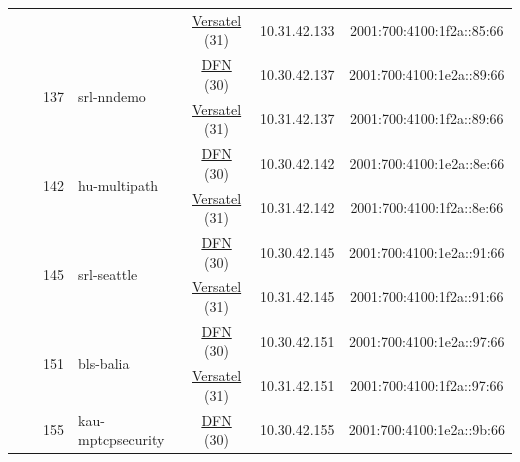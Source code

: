 \begin{small}
\begin{center}
\begin{longtable}{|c|c|c|c|c|c|c|c|}
  &  &  &  & \multicolumn{2}{|c|}{\tiny{\href{http://www.versatel.de}{Versatel} (31)}} & \tiny{10.31.42.133} & \tiny{2001:700:4100:1f2a::85:66} \\* \cline{3-3}\cline{4-4}\cline{5-5}\cline{6-6}\cline{7-7}\cline{8-8}
  &  & \multirow{2}{*}{\tiny{137}} & \multicolumn{1}{|l|}{\multirow{2}{*}{\tiny{srl-nndemo}}} & \multicolumn{2}{|c|}{\tiny{\href{https://www.dfn.de}{DFN} (30)}} & \tiny{10.30.42.137} & \tiny{2001:700:4100:1e2a::89:66} \\* \cline{5-5}\cline{6-6}\cline{7-7}\cline{8-8}
  &  &  &  & \multicolumn{2}{|c|}{\tiny{\href{http://www.versatel.de}{Versatel} (31)}} & \tiny{10.31.42.137} & \tiny{2001:700:4100:1f2a::89:66} \\* \cline{3-3}\cline{4-4}\cline{5-5}\cline{6-6}\cline{7-7}\cline{8-8}
  &  & \multirow{2}{*}{\tiny{142}} & \multicolumn{1}{|l|}{\multirow{2}{*}{\tiny{hu-multipath}}} & \multicolumn{2}{|c|}{\tiny{\href{https://www.dfn.de}{DFN} (30)}} & \tiny{10.30.42.142} & \tiny{2001:700:4100:1e2a::8e:66} \\* \cline{5-5}\cline{6-6}\cline{7-7}\cline{8-8}
  &  &  &  & \multicolumn{2}{|c|}{\tiny{\href{http://www.versatel.de}{Versatel} (31)}} & \tiny{10.31.42.142} & \tiny{2001:700:4100:1f2a::8e:66} \\* \cline{3-3}\cline{4-4}\cline{5-5}\cline{6-6}\cline{7-7}\cline{8-8}
  &  & \multirow{2}{*}{\tiny{145}} & \multicolumn{1}{|l|}{\multirow{2}{*}{\tiny{srl-seattle}}} & \multicolumn{2}{|c|}{\tiny{\href{https://www.dfn.de}{DFN} (30)}} & \tiny{10.30.42.145} & \tiny{2001:700:4100:1e2a::91:66} \\* \cline{5-5}\cline{6-6}\cline{7-7}\cline{8-8}
  &  &  &  & \multicolumn{2}{|c|}{\tiny{\href{http://www.versatel.de}{Versatel} (31)}} & \tiny{10.31.42.145} & \tiny{2001:700:4100:1f2a::91:66} \\* \cline{3-3}\cline{4-4}\cline{5-5}\cline{6-6}\cline{7-7}\cline{8-8}
  &  & \multirow{2}{*}{\tiny{151}} & \multicolumn{1}{|l|}{\multirow{2}{*}{\tiny{bls-balia}}} & \multicolumn{2}{|c|}{\tiny{\href{https://www.dfn.de}{DFN} (30)}} & \tiny{10.30.42.151} & \tiny{2001:700:4100:1e2a::97:66} \\* \cline{5-5}\cline{6-6}\cline{7-7}\cline{8-8}
  &  &  &  & \multicolumn{2}{|c|}{\tiny{\href{http://www.versatel.de}{Versatel} (31)}} & \tiny{10.31.42.151} & \tiny{2001:700:4100:1f2a::97:66} \\* \cline{3-3}\cline{4-4}\cline{5-5}\cline{6-6}\cline{7-7}\cline{8-8}
  &  & \multirow{2}{*}{\tiny{155}} & \multicolumn{1}{|l|}{\multirow{2}{*}{\tiny{kau-mptcpsecurity}}} & \multicolumn{2}{|c|}{\tiny{\href{https://www.dfn.de}{DFN} (30)}} & \tiny{10.30.42.155} & \tiny{2001:700:4100:1e2a::9b:66} \\* \cline{5-5}\cline{6-6}\cline{7-7}\cline{8-8}

\end{longtable}
\end{center}
\end{small}
